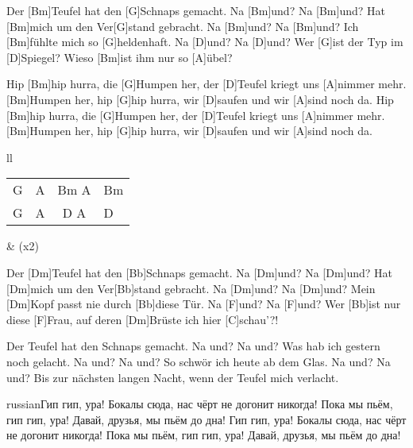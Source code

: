

\begin{guitar}
	Der [Bm]Teufel hat den [G]Schnaps gemacht. Na [Bm]und? Na [Bm]und?
	Hat [Bm]mich um den Ver[G]stand gebracht. Na [Bm]und? Na [Bm]und?
	Ich [Bm]fühlte mich so [G]heldenhaft. Na [D]und? Na [D]und?
	Wer [G]ist der Typ im [D]Spiegel? Wieso [Bm]ist ihm nur so [A]{ü}bel?

	Hip [Bm]hip hurra, die [G]Humpen her, der [D]Teufel kriegt uns [A]nimmer mehr.
	[Bm]Humpen her, hip [G]hip hurra, wir [D]saufen und wir [A]sind noch da.
	Hip [Bm]hip hurra, die [G]Humpen her, der [D]Teufel kriegt uns [A]nimmer mehr.
	[Bm]Humpen her, hip [G]hip hurra, wir [D]saufen und wir [A]sind noch da.
	
	{\footnotesize\begin{tabular}{ll}
			\begin{tabular}{l|l|c|l} G & A & Bm A & Bm \\ G & A & D  A & D\end{tabular} & (x2)
	\end{tabular}}

	Der [Dm]Teufel hat den [Bb]Schnaps gemacht. Na [Dm]und? Na [Dm]und?
	Hat [Dm]mich um den Ver[Bb]stand gebracht. Na [Dm]und? Na [Dm]und?
	Mein [Dm]Kopf passt nie durch [Bb]diese Tür. Na [F]und? Na [F]und?
	Wer [Bb]ist nur diese [F]Frau, auf deren [Dm]Brüste ich hier [C]schau'?!
	
	 
	
	
	Der Teufel hat den Schnaps gemacht. Na und? Na und?
	Was hab ich gestern noch gelacht. Na und? Na und?
	So schwör ich heute ab dem Glas. Na und? Na und?
	Bis zur nächsten langen Nacht, wenn der Teufel mich verlacht.
	
	\begin{otherlanguage*}{russian}Гип гип, ура! Бокалы сюда, нас чёрт не догонит никогда!
	Пока мы пьём, гип гип, ура! Давай, друзья, мы пьём до дна!
	Гип гип, ура! Бокалы сюда, нас чёрт не догонит никогда!
	Пока мы пьём, гип гип, ура! Давай, друзья, мы пьём до дна!\end{otherlanguage*}
	

\end{guitar}
